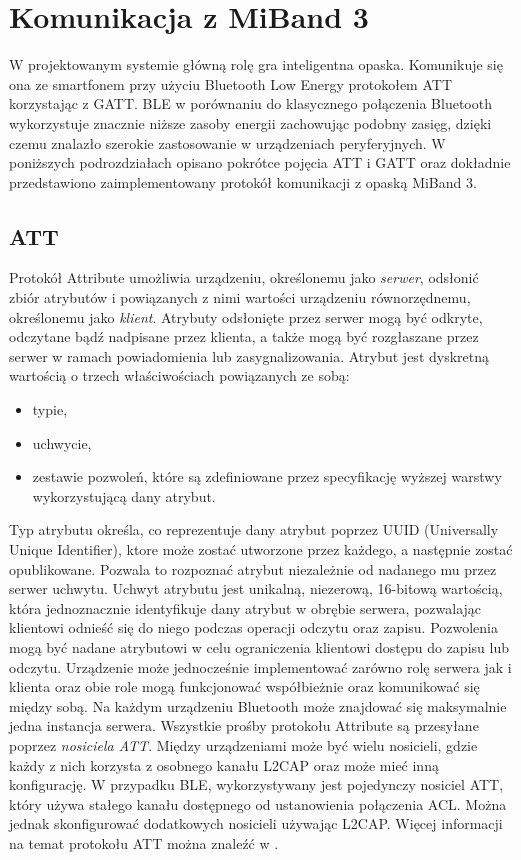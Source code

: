 \section{Komunikacja z MiBand 3}
W projektowanym systemie główną rolę gra inteligentna opaska. Komunikuje się ona ze smartfonem przy użyciu Bluetooth Low Energy protokołem ATT korzystając z GATT. BLE w porównaniu do klasycznego połączenia Bluetooth wykorzystuje znacznie niższe zasoby energii zachowując podobny zasięg, dzięki czemu znalazło szerokie zastosowanie w urządzeniach peryferyjnych. W poniższych podrozdziałach opisano pokrótce pojęcia ATT i GATT oraz dokładnie przedstawiono zaimplementowany protokół komunikacji z opaską MiBand 3.
\subsection{ATT}
Protokół Attribute umożliwia urządzeniu, określonemu jako \textit{serwer}, odsłonić zbiór atrybutów i powiązanych z nimi wartości urządzeniu równorzędnemu, określonemu jako \textit{klient}. Atrybuty odsłonięte przez serwer mogą być odkryte, odczytane bądź nadpisane przez klienta, a także mogą być rozgłaszane przez serwer w ramach powiadomienia lub zasygnalizowania. Atrybut jest dyskretną wartością o trzech właściwościach powiązanych ze sobą:
\begin{itemize}
    \item typie,
    \item uchwycie,
    \item zestawie pozwoleń, które są zdefiniowane przez specyfikację wyższej warstwy wykorzystującą dany atrybut.
\end{itemize}
Typ atrybutu określa, co reprezentuje dany atrybut poprzez UUID (Universally Unique Identifier), ktore może zostać utworzone przez każdego, a następnie zostać opublikowane. Pozwala to rozpoznać atrybut niezależnie od nadanego mu przez serwer uchwytu. Uchwyt atrybutu jest unikalną, niezerową, 16-bitową wartością, która jednoznacznie identyfikuje dany atrybut w obrębie serwera, pozwalając klientowi odnieść się do niego podczas operacji odczytu oraz zapisu. Pozwolenia mogą być nadane atrybutowi w celu ograniczenia klientowi dostępu do zapisu lub odczytu.
\newline\newline
\indent Urządzenie może jednocześnie implementować zarówno rolę serwera jak i klienta oraz obie role mogą funkcjonować współbieżnie oraz komunikować się między sobą. Na każdym urządzeniu Bluetooth może znajdować się maksymalnie jedna instancja serwera.
\newline\newline
\indent Wszystkie prośby protokołu Attribute są przesyłane poprzez \textit{nosiciela ATT}. Między urządzeniami może być wielu nosicieli, gdzie każdy z nich korzysta z osobnego kanału L2CAP oraz może mieć inną konfigurację. W przypadku BLE, wykorzystywany jest pojedynczy nosiciel ATT, który używa stałego kanału dostępnego od ustanowienia połączenia ACL. Można jednak skonfigurować dodatkowych nosicieli używając L2CAP. Więcej informacji na temat protokołu ATT można znaleźć w \cite{BT-Corev5.2}. 

